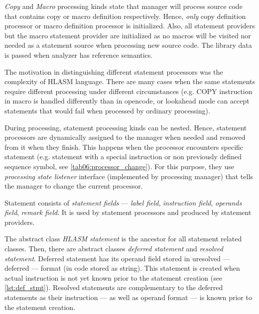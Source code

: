 \emph{Copy} and \emph{Macro} processing kinds state that manager will process source code that contains copy or macro definition respectively. Hence, \emph{only} copy definition processor or macro definition processor is initialized. Also, all statement providers but the macro statement provider are initialized as no macros will be visited nor needed as a statement source when processing new source code. The library data is passed when analyzer has reference semantics.



\label{lab06:sect_proc}

The motivation in distinguishing different statement processors was the complexity of HLASM language. There are many cases when the same statements require different processing under different circumstances (e.g. COPY instruction in macro is handled differently than in opencode, or lookahead mode can accept statements that would fail when processed by ordinary processing).

During processing, statement processing kinds can be nested. Hence, statement processors are dynamically assigned to the manager when needed and removed from it when they finish. This happens when the processor encounters specific statement (e.g. statement with a special instruction or non previously defined sequence symbol, see \cref{tab06:processor_change}). For this purpose, they use \emph{processing state listener} interface (implemented by processing manager) that tells the manager to change the current processor.

Statement consists of \emph{statement fields} --- \emph{label field}, \emph{instruction field}, \emph{operands field}, \emph{remark field}. It is used by statement processors and produced by statement providers. 

The abstract class \emph{HLASM statement} is the ancestor for all statement related classes. Then, there are abstract classes \emph{deferred statement} and \emph{resolved statement}. Deferred statement has its operand field stored in uresolved --- deferred --- format (in code stored as string). This statement is created when actual instruction is not yet known prior to the statement creation (see \cref{lst:def_stmt}). Resolved statements are complementary to the deferred statements as their instruction --- as well as operand format --- is known prior to the statement creation.

